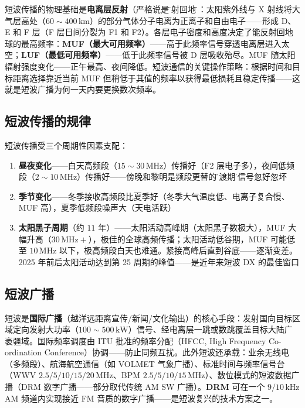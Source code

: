 \documentclass[12pt,UTF8]{ctexbook}
\begin{document}
短波传播的物理基础是\textbf{电离层反射}（严格说是\"折射回地\"）：太阳紫外线与 X 射线将大气层高处（$60\sim400\,\mathrm{km}$）的部分气体分子电离为正离子和自由电子——形成 D、E 和 F 层（F 层日间分裂为 F1 和 F2）。各层电子密度和高度决定了能反射回地球的最高频率：\textbf{MUF（最大可用频率）}——高于此频率信号穿透电离层进入太空；\textbf{LUF（最低可用频率）}——低于此频率信号被 D 层吸收殆尽。MUF 随太阳辐射强度变化——正午最高、夜间降低。短波通信的关键操作策略：根据时间和目标距离选择靠近当前 MUF 但稍低于其值的频率以获得最低损耗且稳定传播——这就是短波广播为何一天内要更换数次频率。

\subsection{短波传播的规律}

短波传播受三个周期性因素支配：
\begin{enumerate}
\item \textbf{昼夜变化}——白天高频段（$15\sim30\,\mathrm{MHz}$）传播好（F2 层电子多），夜间低频段（$2\sim10\,\mathrm{MHz}$）传播好——傍晚和黎明是频段更替的\"过渡期\"，信号忽好忽坏
\item \textbf{季节变化}——冬季接收高频段比夏季好（冬季大气温度低、电离子复合慢、MUF 高），夏季低频段噪声大（天电活跃）
\item \textbf{太阳黑子周期}（约 $11$ 年）——太阳活动高峰期（太阳黑子数极大），MUF 大幅升高（$30\,\mathrm{MHz}+$），极佳的全球高频传播；太阳活动低谷期，MUF 可能低至 $10\,\mathrm{MHz}$ 以下，极高频段白天也难通。紧接高峰后直到谷底——逐渐变差。2025 年前后太阳活动达到第 25 周期的峰值——是近年来短波 DX 的最佳窗口
\end{enumerate}

\subsection{短波广播}

短波是\textbf{国际广播}（越洋远距离宣传/新闻/文化输出）的核心手段：发射国向目标区域定向发射大功率（$100\sim500\,\mathrm{kW}$）信号、经电离层一跳或数跳覆盖目标大陆广袤疆域。国际频率调度由 ITU 批准的频率分配（HFCC, High Frequency Co-ordination Conference）协调——防止同频互扰。此外短波还承载：业余无线电（多频段）、航海航空通信（如 VOLMET 气象广播）、标准时间与频率信号台（WWV $2.5/5/10/15/20\,\mathrm{MHz}$、BPM $2.5/5/10/15\,\mathrm{MHz}$）、数位模式的短波数据广播（DRM 数字广播——部分取代传统 AM SW 广播）。\textbf{DRM} 可在一个 $9/10\,\mathrm{kHz}$ AM 频道内实现接近 FM 音质的数字广播——是短波复兴的技术方案之一。
\end{document}
